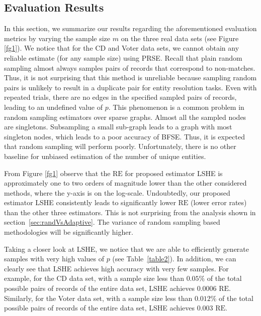 \documentclass{imsart}
\begin{document}
\subsection{Evaluation Results}
In this section, we summarize our results regarding the aforementioned evaluation metrics by varying the sample size $m$ on the three real data sets (see Figure \ref{fg1}). We notice that for the CD and Voter data sets, we cannot obtain any reliable estimate (for any sample size) using PRSE. Recall that plain random sampling almost always samples pairs of records that correspond to non-matches. Thus, it is not surprising that this method is unreliable because sampling random pairs is unlikely to result in a duplicate pair for entity resolution tasks. Even with repeated trials, there are no edges in the specified sampled pairs of records, leading to an undefined value of $p$. This phenomenon is a common problem in random sampling estimators over sparse graphs. Almost all the sampled nodes are singletons. Subsampling a small sub-graph leads to a graph with most singleton nodes, which leads to a poor accuracy of BFSE. Thus, it is expected that random sampling will perform poorly. Unfortunately, there is no other baseline for unbiased estimation of the number of unique entities.

From Figure \ref{fg1} observe that the $\text{RE}$ for proposed estimator LSHE is approximately one to two orders of magnitude lower than the other considered methods, where the  y-axis is on the log-scale. Undoubtedly, our proposed estimator LSHE consistently leads to significantly lower $\text{RE}$ (lower error rates) than the other three estimators. This is not surprising from the analysis shown in section~\ref{sec:randVsAdaptive}. The variance of random sampling based methodologies will be significantly higher.



Taking a closer look at LSHE, we notice that we are able to efficiently generate samples with very high values of $p$ (see Table~\ref{table2}).
In addition, we can clearly see that LSHE achieves high accuracy with very few samples. For example, for the CD data set, with a sample size less than $0.05\%$ of the total possible pairs of records of the entire data set, LSHE achieves $0.0006$ $\text{RE}$. Similarly, for the Voter data set, with a sample size less than $0.012\%$ of the total possible pairs of records of the entire data set, LSHE achieves $0.003$ $\text{RE}$.
\end{document}
